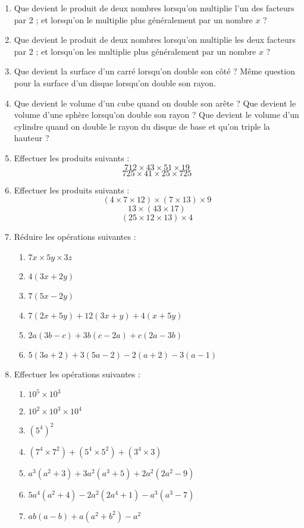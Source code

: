\documentclass[12 pt]{report}
\theoremstyle{plain}
\newcounter{n}
\begin{document}
\begin{enumerate}
\item Que devient le produit de deux nombres lorsqu'on
multiplie l'un des facteurs par 2 ; et lorsqu'on le multiplie plus généralement par un nombre $x$ ? 
\item Que devient le produit de deux nombres lorsqu'on
multiplie les deux facteurs par 2 ; et lorsqu'on les 
multiplie plus généralement par un nombre $x$ ?
\item Que devient la surface d'un carré lorsqu'on 
double son côté ? Même question pour la surface d'un
disque lorsqu'on double son rayon. 
\item Que devient le volume d'un cube quand on double
son arête ? Que devient le volume d'une sphère lorsqu'on double son rayon ? Que devient le volume d'un cylindre quand on double le rayon du disque de base et qu'on triple la hauteur ? 
\item Effectuer les produits suivants : 
\[ 712 \times 43 \times 51 \times 19\]
\[725 \times 41 \times 25 \times 725\]
\item Effectuer les produits suivants : 
\[ (4 \times 7 \times 12) \times (7 \times 13) \times 9\]
\[ 13 \times (43 \times 17)\]
\[ (25 \times 12 \times 13) \times 4\]
\item Réduire les opérations suivantes : 
\begin{enumerate}
\item $7x \times 5y \times 3z$
\item $4(3x + 2y)$
\item $7(5x - 2y)$
\item $7(2x + 5y) + 12(3x + y) + 4(x + 5y)$
\item $2a(3b - c) + 3b(c - 2a) + c(2a -3b)$
\item $5(3a + 2) + 3(5a -2) - 2(a + 2) - 3(a - 1)$
\end{enumerate}
\item Effectuer les opérations suivantes : 
\begin{enumerate}
\item $10^5\times 10^3$
\item $10^2\times 10^3 \times 10^4$
\item $(5^4)^2$
\item $(7^4 \times 7^2) + (5^4 \times 5^2) + 
(3^4 \times 3)$
\item $a^3(a^2 + 3) + 3a^2(a^3 + 5) + 2a^2( 2a^2 - 9)$
\item $5a^4(a^2 + 4) - 2a^2(2a^4 + 1) - a^3(a^3 - 7)$
\item $ab(a - b) + a(a^2 + b^2) - a^2$

\end{enumerate}
\end{enumerate}
\end{document}
